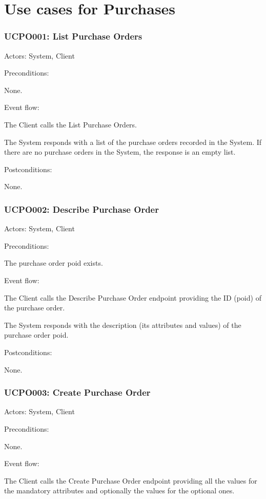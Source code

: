 \section{Use cases for Purchases}

\subsubsection{UCPO001: List Purchase Orders}
\label{UCPO001}

Actors: System, Client

Preconditions:

\ucitem None.

Event flow:

\ucitem The Client calls the List Purchase Orders.

\ucitem The System responds with a list of the purchase orders recorded in the System. If there are no purchase orders in the System, the response is an empty list.

Postconditions: 

\ucitem None.

\subsubsection{UCPO002: Describe Purchase Order}
\label{UCPO002}

Actors: System, Client

Preconditions: 

\ucitem The purchase order poid exists.

Event flow:

\ucitem The Client calls the Describe Purchase Order endpoint providing the ID (poid) of the purchase order.

\ucitem The System responds with the description (its attributes and values) of the purchase order poid.

Postconditions:

\ucitem None.

\subsubsection{UCPO003: Create Purchase Order}
\label{UCPO003}

Actors: System, Client

Preconditions:

\ucitem None.

Event flow:

\ucitem The Client calls the Create Purchase Order endpoint providing all the values for the mandatory attributes and optionally the values for the optional ones.

